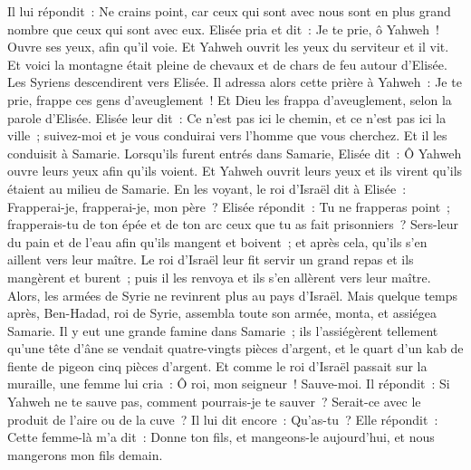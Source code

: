 \begin{multicols}{2}
Il lui répondit~: Ne crains point, car ceux qui sont avec nous sont en plus grand nombre que ceux qui sont avec eux.
Elisée pria et dit~: Je te prie, ô Yahweh~! Ouvre ses yeux, afin qu'il voie. Et Yahweh ouvrit les yeux du serviteur et il vit. Et voici la montagne était pleine de chevaux et de chars de feu autour d'Elisée.
Les Syriens descendirent vers Elisée. Il adressa alors cette prière à Yahweh~: Je te prie, frappe ces gens d'aveuglement~! Et Dieu les frappa d'aveuglement, selon la parole d'Elisée.
Elisée leur dit~: Ce n'est pas ici le chemin, et ce n'est pas ici la ville~; suivez-moi et je vous conduirai vers l'homme que vous cherchez. Et il les conduisit à Samarie.
Lorsqu'ils furent entrés dans Samarie, Elisée dit~: Ô Yahweh ouvre leurs yeux afin qu'ils voient. Et Yahweh ouvrit leurs yeux et ils virent qu'ils étaient au milieu de Samarie.
En les voyant, le roi d'Israël dit à Elisée~: Frapperai-je, frapperai-je, mon père~?
Elisée répondit~: Tu ne frapperas point~; frapperais-tu de ton épée et de ton arc ceux que tu as fait prisonniers~? Sers-leur du pain et de l'eau afin qu'ils mangent et boivent~; et après cela, qu'ils s'en aillent vers leur maître.
Le roi d'Israël leur fit servir un grand repas et ils mangèrent et burent~; puis il les renvoya et ils s'en allèrent vers leur maître. Alors, les armées de Syrie ne revinrent plus au pays d'Israël.
Mais quelque temps après, Ben-Hadad, roi de Syrie, assembla toute son armée, monta, et assiégea Samarie.
Il y eut une grande famine dans Samarie~; ils l'assiégèrent tellement qu'une tête d'âne se vendait quatre-vingts pièces d'argent, et le quart d'un kab de fiente de pigeon cinq pièces d'argent.
Et comme le roi d'Israël passait sur la muraille, une femme lui cria~: Ô roi, mon seigneur~! Sauve-moi.
Il répondit~: Si Yahweh ne te sauve pas, comment pourrais-je te sauver~? Serait-ce avec le produit de l'aire ou de la cuve~?
Il lui dit encore~: Qu'as-tu~? Elle répondit~: Cette femme-là m'a dit~: Donne ton fils, et mangeons-le aujourd'hui, et nous mangerons mon fils demain.

\end{multicols}
